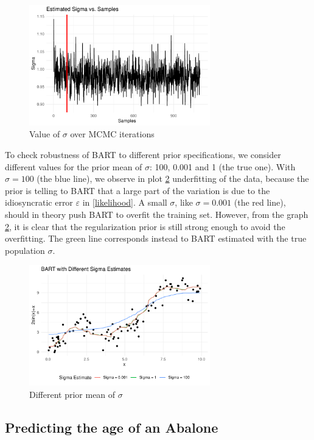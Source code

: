 \documentclass[a4paper,11pt]{article}
\begin{document}
\begin{figure}[h]
  \centering
  \includegraphics[width=0.7\textwidth]{outputs/sigma_plot.pdf}
  \caption{Value of $\sigma$ over MCMC iterations}
  \label{plot_sin2}
\end{figure}


To check robustness of BART to different prior specifications, we consider different values for the prior mean of $\sigma$: 100, 0.001 and 1 (the true one). With $\sigma = 100$ (the blue line), we observe in plot \ref{plot_sin3} underfitting of the data, because the prior is telling to BART that a large part of the variation is due to the idiosyncratic error $\varepsilon$ in \eqref{likelihood}. A small $\sigma$, like $\sigma = 0.001$ (the red line), should in theory push BART to overfit the training set. However, from the graph \ref{plot_sin3}, it is clear that the regularization prior is still strong enough to avoid the overfitting. The green line corresponds instead to BART estimated with the true population $\sigma$.

\begin{figure}[h]
  \centering
  \includegraphics[width=0.7\textwidth]{outputs/sin_plot_diff_sigma.pdf}
  \caption{Different prior mean of $\sigma$}
  \label{plot_sin3}
\end{figure}


\subsection{Predicting the age of an Abalone}
\end{document}
